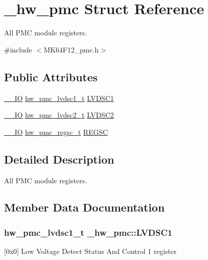 \hypertarget{struct__hw__pmc}{}\section{\+\_\+hw\+\_\+pmc Struct Reference}
\label{struct__hw__pmc}


All P\+MC module registers.  




{\ttfamily \#include $<$M\+K64\+F12\+\_\+pmc.\+h$>$}

\subsection*{Public Attributes}
\begin{DoxyCompactItemize}
\item 
\hyperlink{core__sc300_8h_aec43007d9998a0a0e01faede4133d6be}{\+\_\+\+\_\+\+IO} \hyperlink{union__hw__pmc__lvdsc1}{hw\+\_\+pmc\+\_\+lvdsc1\+\_\+t} \hyperlink{struct__hw__pmc_acbb31c1e494de9825325b8a169c92ec6}{L\+V\+D\+S\+C1}
\item 
\hyperlink{core__sc300_8h_aec43007d9998a0a0e01faede4133d6be}{\+\_\+\+\_\+\+IO} \hyperlink{union__hw__pmc__lvdsc2}{hw\+\_\+pmc\+\_\+lvdsc2\+\_\+t} \hyperlink{struct__hw__pmc_ab25fb2b4183838773bb50a16865d541f}{L\+V\+D\+S\+C2}
\item 
\hyperlink{core__sc300_8h_aec43007d9998a0a0e01faede4133d6be}{\+\_\+\+\_\+\+IO} \hyperlink{union__hw__pmc__regsc}{hw\+\_\+pmc\+\_\+regsc\+\_\+t} \hyperlink{struct__hw__pmc_afb85d4ea5f03175a7189de426614b16c}{R\+E\+G\+SC}
\end{DoxyCompactItemize}


\subsection{Detailed Description}
All P\+MC module registers. 

\subsection{Member Data Documentation}
\subsubsection[{\texorpdfstring{L\+V\+D\+S\+C1}{LVDSC1}}]{ {\bf hw\+\_\+pmc\+\_\+lvdsc1\+\_\+t} \+\_\+hw\+\_\+pmc\+::\+L\+V\+D\+S\+C1}\hypertarget{struct__hw__pmc_acbb31c1e494de9825325b8a169c92ec6}{}\label{struct__hw__pmc_acbb31c1e494de9825325b8a169c92ec6}
\mbox{[}0x0\mbox{]} Low Voltage Detect Status And Control 1 register 
